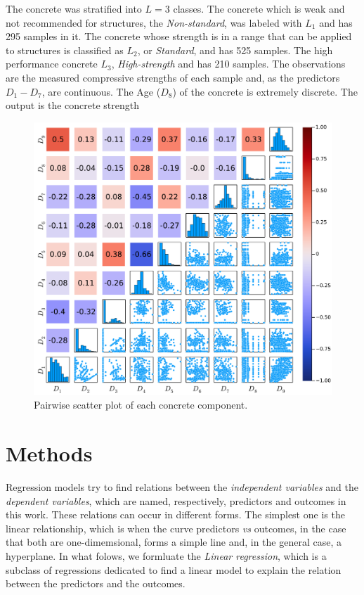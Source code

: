 \documentclass[conference]{IEEEtran}
\begin{document}
The concrete was stratified into $L=3$ classes\cite{b1}. The concrete which is weak and not recommended for structures, the \emph{Non-standard}, was labeled with $L_1$ and has 295 samples in it. The concrete whose strength is in a range that can be applied to structures is classified as $L_2$, or \emph{Standard}, and has 525 samples. The high performance concrete $L_3$, \emph{High-strength} and has 210 samples.
The observations are the measured compressive strengths of each sample and, as the predictors $D_1 - D_7$, are continuous. The Age ($D_8$) of the concrete is extremely discrete. The output is the concrete strength 

\begin{figure}[htbp]
\centerline{\includegraphics[width=\columnwidth]{../figures/correlation_predictors_outcomes}}
\caption{Pairwise scatter plot of each concrete component.}
\label{histogram_biplot}
\end{figure}

\section{Methods}\label{methods}

Regression models try to find relations between the \emph{independent variables} and the \emph{dependent variables}, which are named, respectively, predictors and outcomes in this work. These relations can occur in different forms. The simplest one is the linear relationship, which is when the curve predictors \textit{vs} outcomes, in the case that both are one-dimemsional, forms a simple line and, in the general case, a hyperplane. In what folows, we formluate the \emph{Linear regression}, which is a subclass of regressions dedicated to find a linear model to explain the relation between the predictors and the outcomes. 
\end{document}
